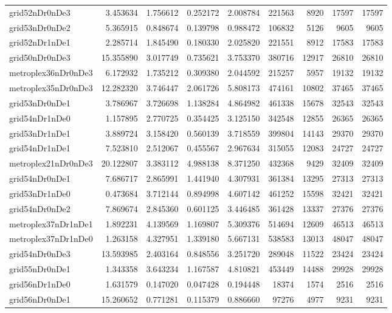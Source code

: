 \documentclass[../../../thesis.tex]{subfiles}
\begin{document}
\begin{longtable}{|l|r|r|r|r|r|r|r|r|}
grid52nDr0nDe3 & 3.453634 & 1.756612 & 0.252172 & 2.008784 & 221563 & 8920 & 17597 & 17597 \\
grid53nDr0nDe2 & 5.365915 & 0.848674 & 0.139798 & 0.988472 & 106832 & 5126 & 9605 & 9605 \\
grid52nDr1nDe1 & 2.285714 & 1.845490 & 0.180330 & 2.025820 & 221551 & 8912 & 17583 & 17583 \\
grid50nDr0nDe3 & 15.355890 & 3.017749 & 0.735621 & 3.753370 & 380716 & 12917 & 26810 & 26810 \\
metroplex36nDr0nDe3 & 6.172932 & 1.735212 & 0.309380 & 2.044592 & 215257 & 5957 & 19132 & 19132 \\
metroplex35nDr0nDe3 & 12.282320 & 3.746447 & 2.061726 & 5.808173 & 474161 & 10802 & 37465 & 37465 \\
grid53nDr0nDe1 & 3.786967 & 3.726698 & 1.138284 & 4.864982 & 461338 & 15678 & 32543 & 32543 \\
grid54nDr1nDe0 & 1.157895 & 2.770725 & 0.354425 & 3.125150 & 342548 & 12855 & 26365 & 26365 \\
grid53nDr1nDe1 & 3.889724 & 3.158420 & 0.560139 & 3.718559 & 399804 & 14143 & 29370 & 29370 \\
grid54nDr1nDe1 & 7.523810 & 2.512067 & 0.455567 & 2.967634 & 315055 & 12083 & 24727 & 24727 \\
metroplex21nDr0nDe3 & 20.122807 & 3.383112 & 4.988138 & 8.371250 & 432368 & 9429 & 32409 & 32409 \\
grid54nDr0nDe1 & 7.686717 & 2.865991 & 1.441940 & 4.307931 & 361384 & 13295 & 27313 & 27313 \\
grid53nDr1nDe0 & 0.473684 & 3.712144 & 0.894998 & 4.607142 & 461252 & 15598 & 32421 & 32421 \\
grid54nDr0nDe2 & 7.869674 & 2.845360 & 0.601125 & 3.446485 & 361428 & 13337 & 27376 & 27376 \\
metroplex37nDr1nDe1 & 1.892231 & 4.139569 & 1.169807 & 5.309376 & 514694 & 12609 & 46513 & 46513 \\
metroplex37nDr1nDe0 & 1.263158 & 4.327951 & 1.339180 & 5.667131 & 538583 & 13013 & 48047 & 48047 \\
grid54nDr0nDe3 & 13.593985 & 2.403164 & 0.848556 & 3.251720 & 289048 & 11522 & 23424 & 23424 \\
grid55nDr0nDe1 & 1.343358 & 3.643234 & 1.167587 & 4.810821 & 453449 & 14488 & 29928 & 29928 \\
grid56nDr1nDe0 & 1.631579 & 0.147020 & 0.047428 & 0.194448 & 18374 & 1574 & 2516 & 2516 \\
grid56nDr0nDe1 & 15.260652 & 0.771281 & 0.115379 & 0.886660 & 97276 & 4977 & 9231 & 9231 \\

\end{longtable}
\end{document}
